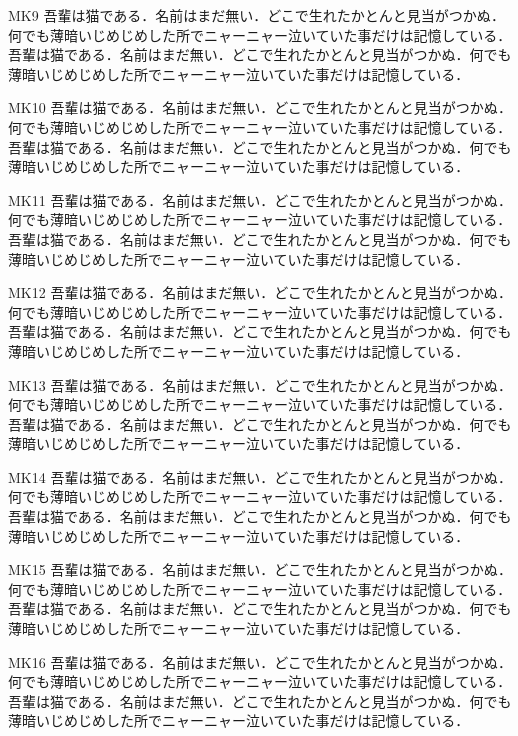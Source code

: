 \documentclass[fontsize=10pt,twocolumn]{jlreq}
\begin{document}
MK9 吾輩は猫である．名前はまだ無い．どこで生れたかとんと見当がつかぬ．何でも薄暗いじめじめした所でニャーニャー泣いていた事だけは記憶している． 吾輩は猫である．名前はまだ無い．どこで生れたかとんと見当がつかぬ．何でも薄暗いじめじめした所でニャーニャー泣いていた事だけは記憶している．\par
{}MK10 吾輩は猫である．名前はまだ無い．どこで生れたかとんと見当がつかぬ．何でも薄暗いじめじめした所でニャーニャー泣いていた事だけは記憶している． 吾輩は猫である．名前はまだ無い．どこで生れたかとんと見当がつかぬ．何でも薄暗いじめじめした所でニャーニャー泣いていた事だけは記憶している．\par
{}MK11 吾輩は猫である．名前はまだ無い．どこで生れたかとんと見当がつかぬ．何でも薄暗いじめじめした所でニャーニャー泣いていた事だけは記憶している． 吾輩は猫である．名前はまだ無い．どこで生れたかとんと見当がつかぬ．何でも薄暗いじめじめした所でニャーニャー泣いていた事だけは記憶している．\par
{}MK12 吾輩は猫である．名前はまだ無い．どこで生れたかとんと見当がつかぬ．何でも薄暗いじめじめした所でニャーニャー泣いていた事だけは記憶している． 吾輩は猫である．名前はまだ無い．どこで生れたかとんと見当がつかぬ．何でも薄暗いじめじめした所でニャーニャー泣いていた事だけは記憶している．\par
{}MK13 吾輩は猫である．名前はまだ無い．どこで生れたかとんと見当がつかぬ．何でも薄暗いじめじめした所でニャーニャー泣いていた事だけは記憶している． 吾輩は猫である．名前はまだ無い．どこで生れたかとんと見当がつかぬ．何でも薄暗いじめじめした所でニャーニャー泣いていた事だけは記憶している．\par
{}MK14 吾輩は猫である．名前はまだ無い．どこで生れたかとんと見当がつかぬ．何でも薄暗いじめじめした所でニャーニャー泣いていた事だけは記憶している． 吾輩は猫である．名前はまだ無い．どこで生れたかとんと見当がつかぬ．何でも薄暗いじめじめした所でニャーニャー泣いていた事だけは記憶している．\par
{}MK15 吾輩は猫である．名前はまだ無い．どこで生れたかとんと見当がつかぬ．何でも薄暗いじめじめした所でニャーニャー泣いていた事だけは記憶している． 吾輩は猫である．名前はまだ無い．どこで生れたかとんと見当がつかぬ．何でも薄暗いじめじめした所でニャーニャー泣いていた事だけは記憶している．\par
{}MK16 吾輩は猫である．名前はまだ無い．どこで生れたかとんと見当がつかぬ．何でも薄暗いじめじめした所でニャーニャー泣いていた事だけは記憶している． 吾輩は猫である．名前はまだ無い．どこで生れたかとんと見当がつかぬ．何でも薄暗いじめじめした所でニャーニャー泣いていた事だけは記憶している．\par
\end{document}

